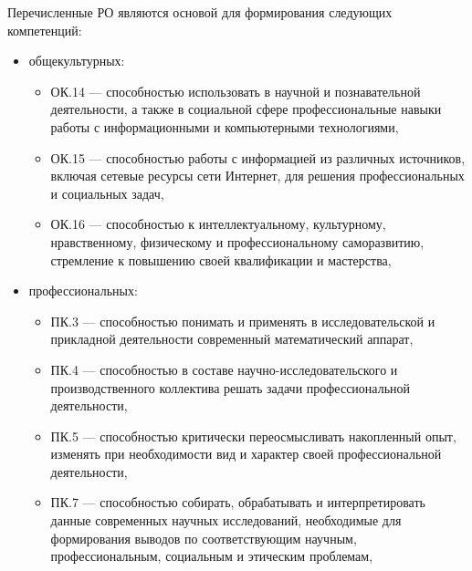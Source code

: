 {Перечисленные РО являются основой для формирования следующих компетенций:
\begin{itemize}
\item общекультурных: \begin{itemize}
\item ОК.14 — способностью использовать в научной и познавательной деятельности, а также в социальной сфере профессиональные навыки работы с информационными и компьютерными технологиями,\item ОК.15 — способностью работы с информацией из различных источников, включая сетевые ресурсы сети Интернет, для решения профессиональных и социальных задач,\item ОК.16 — способностью к интеллектуальному, культурному, нравственному, физическому и профессиональному саморазвитию, стремление к повышению своей квалификации и мастерства,
\end{itemize}\item профессиональных: \begin{itemize}
\item ПК.3 — способностью понимать и применять в исследовательской и прикладной деятельности современный математический аппарат,\item ПК.4 — способностью в составе научно-исследовательского и производственного коллектива решать задачи профессиональной деятельности,\item ПК.5 — способностью критически переосмысливать накопленный опыт, изменять при необходимости вид и характер своей профессиональной деятельности,\item ПК.7 — способностью собирать, обрабатывать и интерпретировать данные современных научных исследований, необходимые для формирования выводов по соответствующим научным, профессиональным, социальным и этическим проблемам,
\end{itemize}
\end{itemize}
}

\newpage
